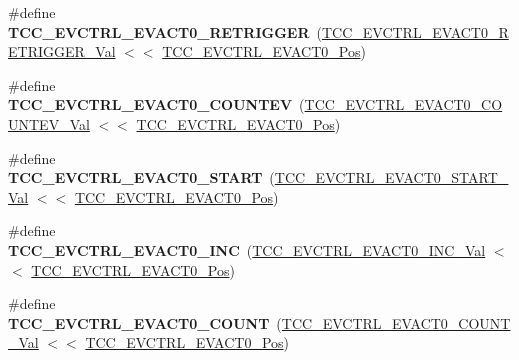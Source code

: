 \begin{DoxyCompactItemize}
\item 
\hypertarget{group___s_a_m_l21___t_c_c_ga9327c10725ab25b3e797e1f08e849b4f}{}\#define {\bfseries T\+C\+C\+\_\+\+E\+V\+C\+T\+R\+L\+\_\+\+E\+V\+A\+C\+T0\+\_\+\+R\+E\+T\+R\+I\+G\+G\+E\+R}~(\hyperlink{group___s_a_m_l21___t_c_c_gac94dcc9808c0c323536a36ef19cc04d4}{T\+C\+C\+\_\+\+E\+V\+C\+T\+R\+L\+\_\+\+E\+V\+A\+C\+T0\+\_\+\+R\+E\+T\+R\+I\+G\+G\+E\+R\+\_\+\+Val} $<$$<$ \hyperlink{group___s_a_m_l21___t_c_c_gaa3e2449eae58d3ef88f4cf52816c4c20}{T\+C\+C\+\_\+\+E\+V\+C\+T\+R\+L\+\_\+\+E\+V\+A\+C\+T0\+\_\+\+Pos})\label{group___s_a_m_l21___t_c_c_ga9327c10725ab25b3e797e1f08e849b4f}

\item 
\hypertarget{group___s_a_m_l21___t_c_c_gaf51861a25283b60298666c878947f08f}{}\#define {\bfseries T\+C\+C\+\_\+\+E\+V\+C\+T\+R\+L\+\_\+\+E\+V\+A\+C\+T0\+\_\+\+C\+O\+U\+N\+T\+E\+V}~(\hyperlink{group___s_a_m_l21___t_c_c_ga166eaa972b7e6f66387006941134d028}{T\+C\+C\+\_\+\+E\+V\+C\+T\+R\+L\+\_\+\+E\+V\+A\+C\+T0\+\_\+\+C\+O\+U\+N\+T\+E\+V\+\_\+\+Val} $<$$<$ \hyperlink{group___s_a_m_l21___t_c_c_gaa3e2449eae58d3ef88f4cf52816c4c20}{T\+C\+C\+\_\+\+E\+V\+C\+T\+R\+L\+\_\+\+E\+V\+A\+C\+T0\+\_\+\+Pos})\label{group___s_a_m_l21___t_c_c_gaf51861a25283b60298666c878947f08f}

\item 
\hypertarget{group___s_a_m_l21___t_c_c_ga7630f9eacc164b421a00d8d819d7306e}{}\#define {\bfseries T\+C\+C\+\_\+\+E\+V\+C\+T\+R\+L\+\_\+\+E\+V\+A\+C\+T0\+\_\+\+S\+T\+A\+R\+T}~(\hyperlink{group___s_a_m_l21___t_c_c_gac05e5e8615b0fb5dcb90eb1c8eb4b8fe}{T\+C\+C\+\_\+\+E\+V\+C\+T\+R\+L\+\_\+\+E\+V\+A\+C\+T0\+\_\+\+S\+T\+A\+R\+T\+\_\+\+Val}   $<$$<$ \hyperlink{group___s_a_m_l21___t_c_c_gaa3e2449eae58d3ef88f4cf52816c4c20}{T\+C\+C\+\_\+\+E\+V\+C\+T\+R\+L\+\_\+\+E\+V\+A\+C\+T0\+\_\+\+Pos})\label{group___s_a_m_l21___t_c_c_ga7630f9eacc164b421a00d8d819d7306e}

\item 
\hypertarget{group___s_a_m_l21___t_c_c_gab7556c0fe2667aceb88c3a6c908b3672}{}\#define {\bfseries T\+C\+C\+\_\+\+E\+V\+C\+T\+R\+L\+\_\+\+E\+V\+A\+C\+T0\+\_\+\+I\+N\+C}~(\hyperlink{group___s_a_m_l21___t_c_c_ga8429cef464b00f7c6bbc13a587375689}{T\+C\+C\+\_\+\+E\+V\+C\+T\+R\+L\+\_\+\+E\+V\+A\+C\+T0\+\_\+\+I\+N\+C\+\_\+\+Val}     $<$$<$ \hyperlink{group___s_a_m_l21___t_c_c_gaa3e2449eae58d3ef88f4cf52816c4c20}{T\+C\+C\+\_\+\+E\+V\+C\+T\+R\+L\+\_\+\+E\+V\+A\+C\+T0\+\_\+\+Pos})\label{group___s_a_m_l21___t_c_c_gab7556c0fe2667aceb88c3a6c908b3672}

\item 
\hypertarget{group___s_a_m_l21___t_c_c_ga2660ac552f8159522903db301ad20ed2}{}\#define {\bfseries T\+C\+C\+\_\+\+E\+V\+C\+T\+R\+L\+\_\+\+E\+V\+A\+C\+T0\+\_\+\+C\+O\+U\+N\+T}~(\hyperlink{group___s_a_m_l21___t_c_c_ga583a6f52e05818d2792e70a607432cc6}{T\+C\+C\+\_\+\+E\+V\+C\+T\+R\+L\+\_\+\+E\+V\+A\+C\+T0\+\_\+\+C\+O\+U\+N\+T\+\_\+\+Val}   $<$$<$ \hyperlink{group___s_a_m_l21___t_c_c_gaa3e2449eae58d3ef88f4cf52816c4c20}{T\+C\+C\+\_\+\+E\+V\+C\+T\+R\+L\+\_\+\+E\+V\+A\+C\+T0\+\_\+\+Pos})\label{group___s_a_m_l21___t_c_c_ga2660ac552f8159522903db301ad20ed2}


\end{DoxyCompactItemize}
